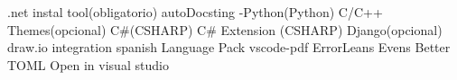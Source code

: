 .net instal tool(obligatorio)
autoDocsting -Python(Python)
C/C++ Themes(opcional)
C#(CSHARP)
C# Extension (CSHARP)
Django(opcional)
draw.io integration
spanish Language Pack
vscode-pdf
ErrorLeans
Evens Better TOML
Open in visual studio 